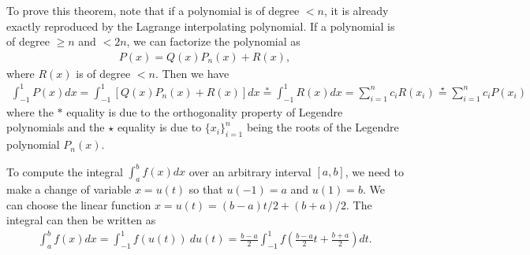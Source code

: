 \documentclass{revtex4-2}
\theoremstyle{definition}
\begin{document}
To prove this theorem, note that if a polynomial is of degree $< n$, it is already exactly reproduced by the Lagrange
interpolating polynomial. If a polynomial is of degree $\geq n$ and $< 2n$, we can factorize the polynomial as
\begin{align}
    P(x) = Q(x) P_n(x) + R(x),
\end{align}
where $R(x)$ is of degree $< n$. Then we have
\begin{align}
    \int_{-1}^1 P(x) dx = \int_{-1}^1 [Q(x)P_n(x) + R(x)] dx \stackrel{*}{=} \int_{-1}^1 R(x) dx
                        = \sum_{i=1}^n c_i R(x_i) \stackrel{\star}{=} \sum_{i=1}^n c_i P(x_i)
\end{align}
where the $*$ equality is due to the orthogonality property of Legendre polynomials and the $\star$ equality is due to
$\{x_i\}_{i=1}^n$ being the roots of the Legendre polynomial $P_n(x)$. 

To compute the integral $\int_a^b f(x) dx$ over an arbitrary interval $[a, b]$, we need to make a change of variable
$x = u(t)$ so that $u(-1) = a$ and $u(1) = b$. We can choose the linear function $x = u(t) = (b-a)t/2 + (b+a)/2$. The
integral can then be written as
\begin{align}
    \int_a^b f(x) dx = \int_{-1}^1 f(u(t))\ d u(t) 
                     = \frac{b - a}{2} \int_{-1}^1 f\left(\frac{b-a}{2} t + \frac{b + a}{2}\right) dt.
\end{align}


\end{document}
